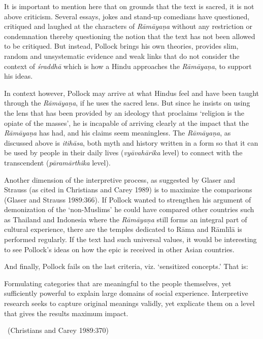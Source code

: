 It is important to mention here that on grounds that the text is sacred, it is not above criticism. Several essays, jokes and stand-up comedians have questioned, critiqued and laughed at the characters of \textit{Rāmāyaṇa} without any restriction or condemnation thereby questioning the notion that the text has not been allowed to be critiqued. But instead, Pollock brings his own theories, provides slim, random and unsystematic evidence and weak links that do not consider the context of \textit{śraddhā} which is how a Hindu approaches the \textit{Rāmāyaṇa}, to support his ideas.

In context however, Pollock may arrive at what Hindus feel and have been taught through the \textit{Rāmāyaṇa}, if he uses the sacred lens. But since he insists on using the lens that has been provided by an ideology that proclaims ‘religion is the opiate of the masses’, he is incapable of arriving clearly at the impact that the \textit{Rāmāyaṇa} has had, and his claims seem meaningless. The \textit{Rāmāyaṇa}, as discussed above is \textit{itihāsa}, both myth and history written in a form so that it can be used by people in their daily lives (\textit{vyāvahārika} level) to connect with the transcendent (\textit{pāramārthika} level).

Another dimension of the interpretive process, as suggested by Glaser and Strauss (as cited in Christians and Carey 1989) is to maximize the comparisons (Glaser and Strauss 1989:366). If Pollock wanted to strengthen his argument of demonization of the ‘non-Muslims’ he could have compared other countries such as Thailand and Indonesia where the \textit{Rāmāyaṇa} still forms an integral part of cultural experience, there are the temples dedicated to Rāma and Rāmlīlā is performed regularly. If the text had such universal values, it would be interesting to see Pollock’s ideas on how the epic is received in other Asian countries.

And finally, Pollock fails on the last criteria, viz. ‘sensitized concepts.’ That is:

\begin{myquote}
Formulating categories that are meaningful to the people themselves, yet sufficiently powerful to explain large domains of social experience. Interpretive research seeks to capture original meanings validly, yet explicate them on a level that gives the results maximum impact. 

~\hfill (Christians and Carey 1989:370)
\end{myquote}


